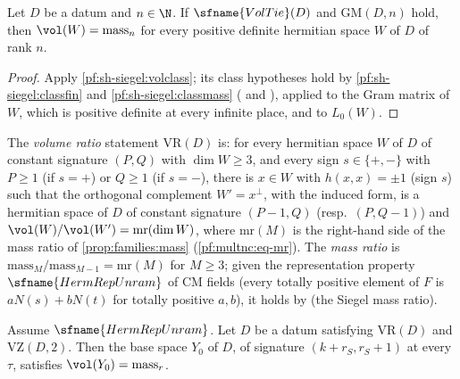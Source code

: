 \begin{theorem}\label{pf:sh-siegel:volmass}
Let $D$ be a datum and $n\in\N$. If $\sfname{VolTie}(D)$ and $\mathrm{GM}(D,n)$ hold, then $\vol(W)=\mathrm{mass}_n$ for every
positive definite hermitian space $W$ of $D$ of rank $n$.
\end{theorem}

\begin{proof}
Apply \cref{pf:sh-siegel:volclass}; its class hypotheses hold by \cref{pf:sh-siegel:classfin} and \cref{pf:sh-siegel:classmass}
( and ),
applied to the Gram matrix of $W$, which is positive definite at every infinite place, and to $L_0(W)$.
\end{proof}

\begin{definition}\label{pf:sh-siegel:vrdef}
The \emph{volume ratio} statement $\mathrm{VR}(D)$ is: for every hermitian space $W$ of $D$
of constant signature $(P,Q)$ with $\dim W\ge3$, and every sign $s\in\{+,-\}$ with $P\ge1$ (if $s=+$) or $Q\ge1$ (if $s=-$),
there is $x\in W$ with $h(x,x)=\pm1$ (sign $s$) such that the orthogonal complement $W'=x^\perp$, with the induced form, is a
hermitian space of $D$ of constant signature $(P-1,Q)$ (resp.\ $(P,Q-1)$) and $\vol(W)/\vol(W')=\mathrm{mr}(\dim W)$, where
$\mathrm{mr}(M)$ is the right-hand side of the mass ratio of \cref{prop:families:mass} (\cref{pf:multnc:eq-mr}). The
\emph{mass ratio} is $\mathrm{mass}_M/\mathrm{mass}_{M-1}=\mathrm{mr}(M)$ for $M\ge3$; given the representation property
$\sfname{HermRepUnram}$ of CM fields (every totally positive element of $F$ is $aN(s)+bN(t)$ for totally positive $a,b$), it
holds by  (the Siegel mass ratio).
\end{definition}

\begin{theorem}\label{pf:sh-siegel:baseVol}
Assume $\sfname{HermRepUnram}$. Let $D$ be a datum satisfying $\mathrm{VR}(D)$ and $\mathrm{VZ}(D,2)$. Then the base space
$Y_0$ of $D$, of signature $(k+r_S,r_S+1)$ at every $\tau$, satisfies $\vol(Y_0)=\mathrm{mass}_r$.
\end{theorem}

